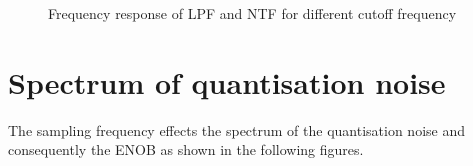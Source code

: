 \documentclass[a4paper]{article}
\begin{document}
\begin{figure}[!h]
\begin{minipage}{0.45\linewidth}
		\caption{Frequency response of LPF and NTF for different cutoff frequency}
		\label{fig:LPFNTFvsfreq}
	\end{minipage}
\end{figure}



\newpage
\section{Spectrum of quantisation noise}
The sampling frequency effects the spectrum of the quantisation noise and consequently the ENOB as shown in the following figures. 
\end{document}
